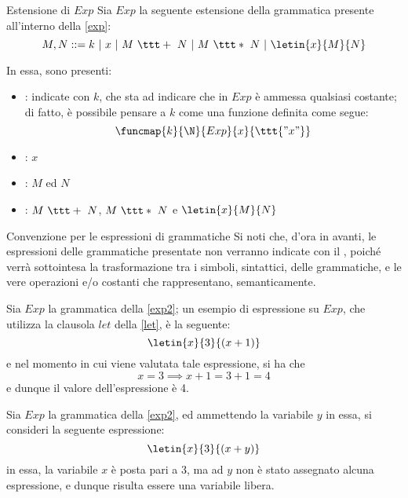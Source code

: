 \documentclass[a4paper, 12pt]{report}
\begin{document}
    \begin{frameddefn}[label={exp2}]{Estensione di $Exp$}
        Sia $Exp$ la seguente estensione della grammatica presente all'interno della \cref{exp}: $$M, N ::= k \ | \ x \ | \ M \ \ttt + \ N \ | \ M \ \ttt * \ N \ | \ \letin{x}{M}{N}$$

        In essa, sono presenti:

        \begin{itemize}
            \item {}: indicate con $k$, che sta ad indicare che in $Exp$ è ammessa qualsiasi costante; di fatto, è possibile pensare a $k$ come una funzione definita come segue: $$\funcmap{k}{\N}{Exp}{x}{\ttt{"x"}}$$
            \item {}: $x$
            \item {}: $M$ ed $N$
            \item {}: $M \ \ttt + \ N$, $M \ \ttt * \ N$ e $\letin{x}{M}{N}$
        \end{itemize}
    \end{frameddefn}

    \begin{framedobs}{Convenzione per le espressioni di grammatiche}
        Si noti che, d'ora in avanti, le espressioni delle grammatiche presentate non verranno indicate con il , poiché verrà sottointesa la trasformazione tra i simboli, sintattici, delle grammatiche, e le vere operazioni e/o costanti che rappresentano, semanticamente.
    \end{framedobs}

    \begin{example}
        Sia $Exp$ la grammatica della \cref{exp2}; un esempio di espressione su $Exp$, che utilizza la clausola $let$ della \cref{let}, è la seguente: $$\letin{x}{3}{(x + 1)}$$ e nel momento in cui viene valutata tale espressione, si ha che $$x = 3 \implies x + 1 = 3 + 1 = 4$$ e dunque il valore dell'espressione è 4.
    \end{example}

    \begin{example}
        Sia $Exp$ la grammatica della \cref{exp2}, ed ammettendo la variabile $y$ in essa, si consideri la seguente espressione: $$\letin{x}{3}{(x + y)}$$ in essa, la variabile $x$ è posta pari a 3, ma ad $y$ non è stato assegnato alcuna espressione, e dunque risulta essere una variabile libera.
    \end{example}
\end{document}
